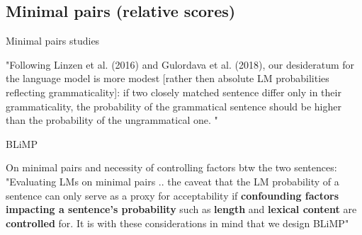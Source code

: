 

\subsection{Minimal pairs (relative scores)}
Minimal pairs studies \citep{warstadt2020blimp, linzen2016assessing, marvin2018targeted, wilcox2018rnn}


"Following Linzen et al. (2016) and Gulordava et al. (2018), our desideratum for the language model is more modest [rather then absolute LM probabilities reflecting grammaticality]: if two closely matched sentence differ only in their grammaticality, the probability of the grammatical sentence should be higher than the probability of the ungrammatical one. "  \citep{marvin2018targeted}



BLiMP

On minimal pairs and necessity of controlling factors btw the two sentences:
"Evaluating LMs on minimal pairs .. the caveat that the LM probability of a sentence can only serve as a proxy for acceptability if \textbf{confounding factors impacting a sentence’s probability} such as \textbf{length} and \textbf{lexical content} are \textbf{controlled} for. It is with these considerations in mind that we design BLiMP"


